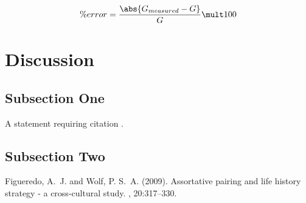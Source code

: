\documentclass[twoside,twocolumn]{article}
\begin{document}
\begin{equation}
\label{eq:error}
 \% error = \frac{\abs{G_{measured} - G}}{G} \mult 100
\end{equation}


\section{Discussion}

\subsection{Subsection One}

A statement requiring citation \cite{Figueredo:2009dg}.


\subsection{Subsection Two}


\begin{thebibliography}{99} %

Figueredo, A.~J. and Wolf, P. S.~A. (2009).
\newblock Assortative pairing and life history strategy - a cross-cultural
  study.
, 20:317--330.

\end{thebibliography}

\end{document}
